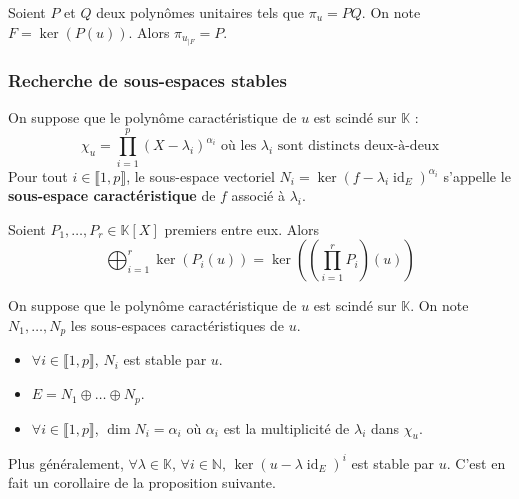 	\begin{proposition}
		Soient $P$ et $Q$ deux polynômes unitaires tels que $\pi_u = PQ$. On note $F = \ker{(P(u))}$. Alors $\pi_{u_{|F}} = P$.
	\end{proposition}

	\subsubsection{Recherche de sous-espaces stables}


	\begin{definition}
		On suppose que le polynôme caractéristique de $u$ est scindé sur $\mathbb{K}$ :
		\[ \chi_u = \prod_{i=1}^p (X - \lambda_i)^{\alpha_i} \text{ où les } \lambda_i \text{ sont distincts deux-à-deux} \]
		Pour tout $i \in \llbracket 1, p \rrbracket$, le sous-espace vectoriel $N_i = \ker{(f - \lambda_i \operatorname{id}_E)^{\alpha_i}}$ s'appelle le \textbf{sous-espace caractéristique} de $f$ associé à $\lambda_i$.
	\end{definition}


	\begin{proposition}
		Soient $P_1, \dots, P_r \in \mathbb{K}[X]$ premiers entre eux. Alors
		\[ \bigoplus_{i=1}^r \ker{(P_i(u))} = \ker \left( \left( \prod_{i=1}^r P_i \right) \left ( u \right) \right) \]
	\end{proposition}


	\begin{proposition}
		On suppose que le polynôme caractéristique de $u$ est scindé sur $\mathbb{K}$. On note $N_1, \dots, N_p$ les sous-espaces caractéristiques de $u$.
		\begin{itemize}
			\item $\forall i \in \llbracket 1, p \rrbracket$, $N_i$ est stable par $u$.
			\item $E = N_1 \oplus \dots \oplus N_p$.
			\item $\forall i \in \llbracket 1, p \rrbracket$, $\dim{N_i} = \alpha_i$ où $\alpha_i$ est la multiplicité de $\lambda_i$ dans $\chi_u$.
		\end{itemize}
	\end{proposition}


	\begin{remark}
		Plus généralement, $\forall \lambda \in \mathbb{K}, \, \forall i \in \mathbb{N}, \, \ker{(u - \lambda \operatorname{id}_E)^i}$ est stable par $u$. C'est en fait un corollaire de la proposition suivante.
	\end{remark}

